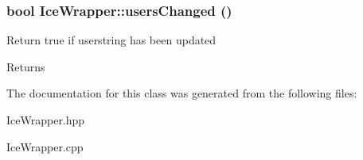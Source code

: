 \hypertarget{classIceWrapper_a648c6cda7c64d23fa210e6e62609644d}{
\subsubsection[{usersChanged}]{\setlength{\rightskip}{0pt plus 5cm}bool IceWrapper::usersChanged ()}}
\label{classIceWrapper_a648c6cda7c64d23fa210e6e62609644d}
Return true if userstring has been updated \begin{DoxyReturn}{Returns}

\end{DoxyReturn}


The documentation for this class was generated from the following files:\begin{DoxyCompactItemize}
\item 
IceWrapper.hpp\item 
IceWrapper.cpp\end{DoxyCompactItemize}
